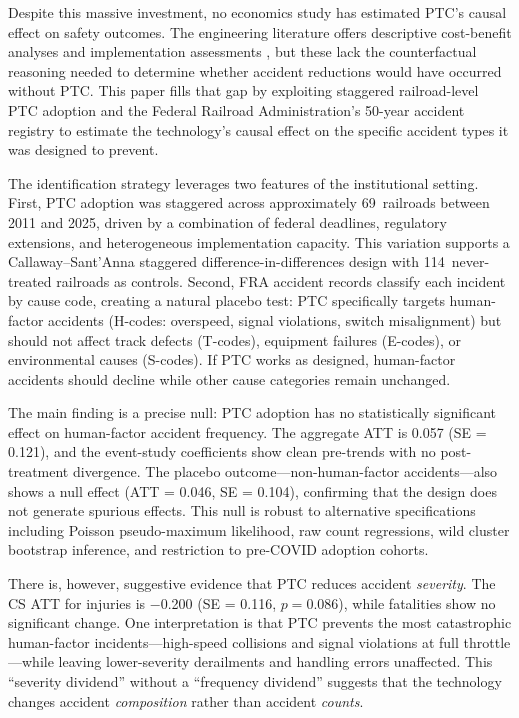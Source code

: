 \documentclass[12pt]{article}
\begin{document}
Despite this massive investment, no economics study has estimated PTC's causal effect on safety outcomes. The engineering literature offers descriptive cost-benefit analyses \citep{Evans2013PTC} and implementation assessments \citep{Lin2019PTC, GAO2020PTC}, but these lack the counterfactual reasoning needed to determine whether accident reductions would have occurred without PTC. This paper fills that gap by exploiting staggered railroad-level PTC adoption and the Federal Railroad Administration's 50-year accident registry to estimate the technology's causal effect on the specific accident types it was designed to prevent.

The identification strategy leverages two features of the institutional setting. First, PTC adoption was staggered across approximately 69~railroads between 2011 and 2025, driven by a combination of federal deadlines, regulatory extensions, and heterogeneous implementation capacity. This variation supports a Callaway--Sant'Anna staggered difference-in-differences design \citep{CallawayS2021} with 114~never-treated railroads as controls. Second, FRA accident records classify each incident by cause code, creating a natural placebo test: PTC specifically targets human-factor accidents (H-codes: overspeed, signal violations, switch misalignment) but should not affect track defects (T-codes), equipment failures (E-codes), or environmental causes (S-codes). If PTC works as designed, human-factor accidents should decline while other cause categories remain unchanged.

The main finding is a precise null: PTC adoption has no statistically significant effect on human-factor accident frequency. The aggregate ATT is 0.057 (SE = 0.121), and the event-study coefficients show clean pre-trends with no post-treatment divergence. The placebo outcome---non-human-factor accidents---also shows a null effect (ATT = 0.046, SE = 0.104), confirming that the design does not generate spurious effects. This null is robust to alternative specifications including Poisson pseudo-maximum likelihood, raw count regressions, wild cluster bootstrap inference, and restriction to pre-COVID adoption cohorts.

There is, however, suggestive evidence that PTC reduces accident \textit{severity}. The CS ATT for injuries is $-$0.200 (SE = 0.116, $p = 0.086$), while fatalities show no significant change. One interpretation is that PTC prevents the most catastrophic human-factor incidents---high-speed collisions and signal violations at full throttle---while leaving lower-severity derailments and handling errors unaffected. This ``severity dividend'' without a ``frequency dividend'' suggests that the technology changes accident \textit{composition} rather than accident \textit{counts}.
\end{document}

